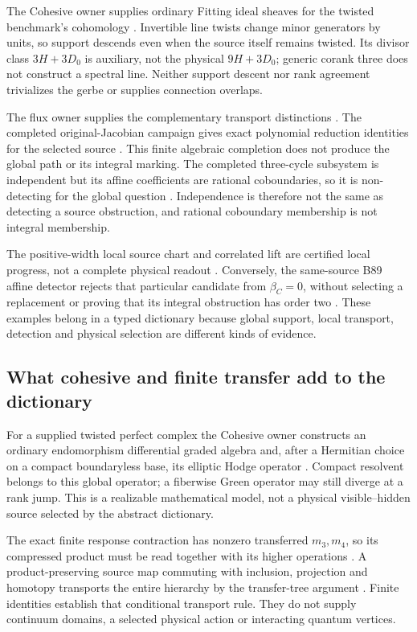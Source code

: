 \documentclass[11pt]{article}
\begin{document}
The Cohesive owner supplies ordinary Fitting ideal sheaves for the
twisted benchmark's cohomology \cite{OwnerCohesive,ConsumerFitting}.
Invertible line twists change minor generators by units, so support
descends even when the source itself remains twisted. Its divisor class
\(3H+3D_0\) is auxiliary, not the physical \(9H+3D_0\); generic corank
three does not construct a spectral line. Neither support descent nor
rank agreement trivializes the gerbe or supplies connection overlaps.

The flux owner supplies the complementary transport distinctions
\cite{OwnerFlux}. The completed original-Jacobian campaign gives exact
polynomial reduction identities for the selected source
\cite{ConsumerGateOne}. This finite algebraic completion does not
produce the global path or its integral marking. The completed
three-cycle subsystem is independent but its affine coefficients are
rational coboundaries, so it is non-detecting for the global question
\cite{ConsumerThreeCycle}. Independence is therefore not the same as
detecting a source obstruction, and rational coboundary membership is
not integral membership.

The positive-width local source chart and correlated lift are certified
local progress, not a complete physical readout
\cite{ConsumerTube}. Conversely, the same-source B89 affine detector
rejects that particular candidate from \(\beta_C=0\), without selecting
a replacement or proving that its integral obstruction has order two
\cite{ConsumerB89}. These examples belong in a typed dictionary because
global support, local transport, detection and physical selection are
different kinds of evidence.

\subsection{What cohesive and finite transfer add to the dictionary}
\label{sec:cohesive-consumers}

For a supplied twisted perfect complex the Cohesive owner constructs
an ordinary endomorphism differential graded algebra and, after a
Hermitian choice on a compact boundaryless base, its elliptic Hodge
operator \cite{OwnerCohesive,ConsumerCohesive}. Compact resolvent belongs
to this global operator; a fiberwise Green operator may still diverge at
a rank jump. This is a realizable mathematical model, not a physical
visible--hidden source selected by the abstract dictionary.

The exact finite response contraction has nonzero transferred
\(m_3,m_4\), so its compressed product must be read together with its
higher operations \cite{ConsumerMThree,ConsumerMFour}. A
product-preserving source map commuting with inclusion, projection and
homotopy transports the entire hierarchy by the transfer-tree argument
\cite{ConsumerAllArity}. Finite identities establish that conditional
transport rule. They do not supply continuum domains, a selected physical
action or interacting quantum vertices.
\end{document}
